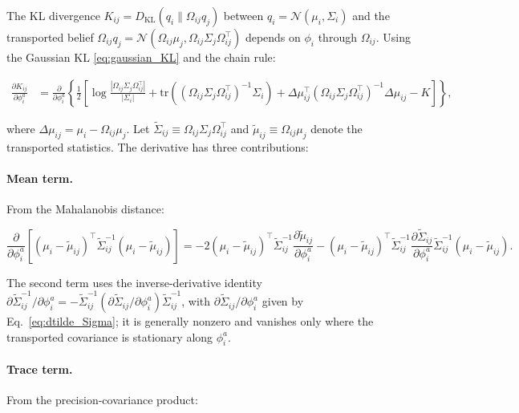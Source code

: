 \documentclass[twoside,11pt]{article}
\begin{document}
The KL divergence $K_{ij} = D_{\mathrm{KL}}(q_i \| \Omega_{ij} q_j)$ between $q_i = \mathcal{N}(\mu_i, \Sigma_i)$ and the transported belief $\Omega_{ij} q_j = \mathcal{N}(\Omega_{ij}\mu_j, \Omega_{ij}\Sigma_j\Omega_{ij}^\top)$ depends on $\phi_i$ through $\Omega_{ij}$. Using the Gaussian KL \eqref{eq:gaussian_KL} and the chain rule:

\begin{align}
\frac{\partial K_{ij}}{\partial \phi_i^a}
&= \frac{\partial}{\partial \phi_i^a}\left\{
\frac{1}{2}\left[
\log\frac{|\Omega_{ij}\Sigma_j\Omega_{ij}^\top|}{|\Sigma_i|}
+ \mathrm{tr} \left((\Omega_{ij}\Sigma_j\Omega_{ij}^\top)^{-1}\Sigma_i\right)
+ \Delta\mu_{ij}^\top (\Omega_{ij}\Sigma_j\Omega_{ij}^\top)^{-1} \Delta\mu_{ij}
- K
\right]\right\},
\label{eq:dKL_dphi_expanded}
\end{align}

where $\Delta\mu_{ij} = \mu_i - \Omega_{ij}\mu_j$. Let $\tilde{\Sigma}_{ij} \equiv \Omega_{ij}\Sigma_j\Omega_{ij}^\top$ and $\tilde{\mu}_{ij} \equiv \Omega_{ij}\mu_j$ denote the transported statistics. The derivative has three contributions:

\paragraph{Mean term.} From the Mahalanobis distance:

\begin{equation}
\frac{\partial}{\partial \phi_i^a}\left[(\mu_i - \tilde{\mu}_{ij})^\top \tilde{\Sigma}_{ij}^{-1}(\mu_i - \tilde{\mu}_{ij})\right]
= -2(\mu_i - \tilde{\mu}_{ij})^\top \tilde{\Sigma}_{ij}^{-1} \frac{\partial \tilde{\mu}_{ij}}{\partial \phi_i^a}
- (\mu_i - \tilde{\mu}_{ij})^\top \tilde{\Sigma}_{ij}^{-1} \frac{\partial \tilde{\Sigma}_{ij}}{\partial \phi_i^a} \tilde{\Sigma}_{ij}^{-1} (\mu_i - \tilde{\mu}_{ij}).
\label{eq:mean_term_phi}
\end{equation}

The second term uses the inverse-derivative identity $\partial\tilde{\Sigma}_{ij}^{-1}/\partial\phi_i^a = -\tilde{\Sigma}_{ij}^{-1}(\partial\tilde{\Sigma}_{ij}/\partial\phi_i^a)\tilde{\Sigma}_{ij}^{-1}$, with $\partial\tilde{\Sigma}_{ij}/\partial\phi_i^a$ given by Eq.~\eqref{eq:dtilde_Sigma}; it is generally nonzero and vanishes only where the transported covariance is stationary along $\phi_i^a$.

\paragraph{Trace term.} From the precision-covariance product:
\end{document}
